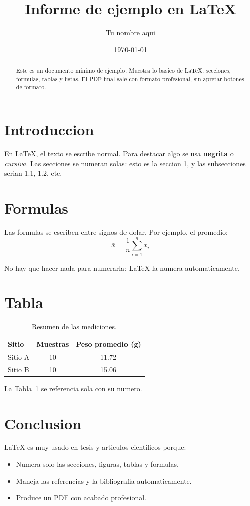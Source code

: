 \documentclass[11pt, a4paper]{article}
\title{Informe de ejemplo en LaTeX}
\author{Tu nombre aqui}
\date{\today}
\begin{document}
\maketitle

\begin{abstract}
Este es un documento minimo de ejemplo. Muestra lo basico de LaTeX:
secciones, formulas, tablas y listas. El PDF final sale con formato
profesional, sin apretar botones de formato.
\end{abstract}

\section{Introduccion}

En LaTeX, el texto se escribe normal. Para destacar algo se usa
\textbf{negrita} o \textit{cursiva}. Las secciones se numeran solas:
esto es la seccion 1, y las subsecciones serian 1.1, 1.2, etc.

\section{Formulas}

Las formulas se escriben entre signos de dolar. Por ejemplo, el promedio:
\begin{equation}
    \bar{x} = \frac{1}{n} \sum_{i=1}^{n} x_i
\end{equation}

No hay que hacer nada para numerarla: LaTeX la numera automaticamente.

\section{Tabla}

\begin{table}[h]
    \centering
    \begin{tabular}{lcc}
        \toprule
        Sitio    & Muestras & Peso promedio (g) \\
        \midrule
        Sitio A  & 10       & 11.72 \\
        Sitio B  & 10       & 15.06 \\
        \bottomrule
    \end{tabular}
    \caption{Resumen de las mediciones.}
    \label{tab:resumen}
\end{table}

La Tabla~\ref{tab:resumen} se referencia sola con su numero.

\section{Conclusion}

LaTeX es muy usado en tesis y articulos cientificos porque:
\begin{itemize}
    \item Numera solo las secciones, figuras, tablas y formulas.
    \item Maneja las referencias y la bibliografia automaticamente.
    \item Produce un PDF con acabado profesional.
\end{itemize}
\end{document}
